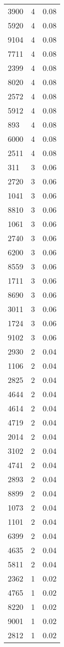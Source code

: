 \begin{table*}[htbp]
\begin{tabular}{lrr}
3900 & 4 & 0.08 \\
5920 & 4 & 0.08 \\
9104 & 4 & 0.08 \\
7711 & 4 & 0.08 \\
2399 & 4 & 0.08 \\
8020 & 4 & 0.08 \\
2572 & 4 & 0.08 \\
5912 & 4 & 0.08 \\
893 & 4 & 0.08 \\
6000 & 4 & 0.08 \\
2511 & 4 & 0.08 \\
311 & 3 & 0.06 \\
2720 & 3 & 0.06 \\
1041 & 3 & 0.06 \\
8810 & 3 & 0.06 \\
1061 & 3 & 0.06 \\
2740 & 3 & 0.06 \\
6200 & 3 & 0.06 \\
8559 & 3 & 0.06 \\
1711 & 3 & 0.06 \\
8690 & 3 & 0.06 \\
3011 & 3 & 0.06 \\
1724 & 3 & 0.06 \\
9102 & 3 & 0.06 \\
2930 & 2 & 0.04 \\
1106 & 2 & 0.04 \\
2825 & 2 & 0.04 \\
4644 & 2 & 0.04 \\
4614 & 2 & 0.04 \\
4719 & 2 & 0.04 \\
2014 & 2 & 0.04 \\
3102 & 2 & 0.04 \\
4741 & 2 & 0.04 \\
2893 & 2 & 0.04 \\
8899 & 2 & 0.04 \\
1073 & 2 & 0.04 \\
1101 & 2 & 0.04 \\
6399 & 2 & 0.04 \\
4635 & 2 & 0.04 \\
5811 & 2 & 0.04 \\
2362 & 1 & 0.02 \\
4765 & 1 & 0.02 \\
8220 & 1 & 0.02 \\
9001 & 1 & 0.02 \\
2812 & 1 & 0.02 \\

\end{tabular}
\end{table*}
